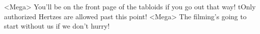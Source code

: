 <Mega> You'll be on the front page of the tabloids if you go out that way! 
tOnly authorized Hertzes are allowed past this point! 
<Mega> The filming's going to start without us if we don't hurry! 
